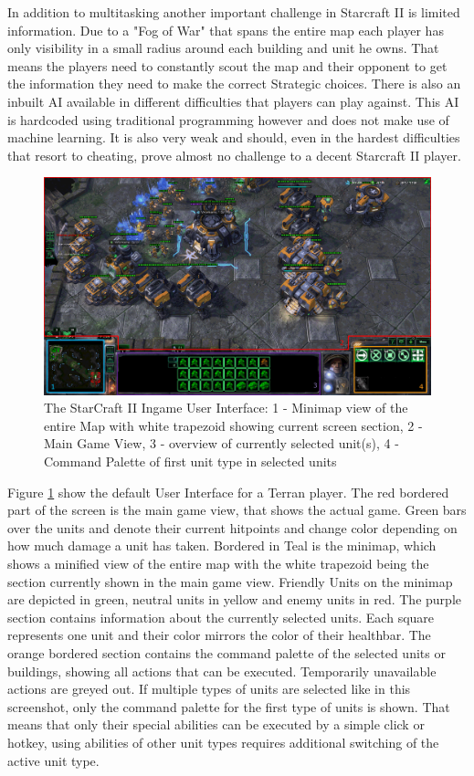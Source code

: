 In addition to multitasking another important challenge in Starcraft II is limited information. Due to a "Fog of War" that spans the entire map each player has only visibility in a small radius around each building and unit he owns. That means the players need to constantly scout the map and their opponent to get the information they need to make the correct Strategic choices.
There is also an inbuilt AI available in different difficulties that players can play against. This AI is hardcoded using traditional programming however and does not make use of machine learning. It is also very weak and should, even in the hardest difficulties that resort to cheating, prove almost no challenge to a decent Starcraft II player.

\begin{figure}[htb]
  \centering
      \includegraphics[width=1\textwidth]{Figures/gameview_bordered.png}
  \caption{The StarCraft II Ingame User Interface: 1 - Minimap view of the entire Map with white trapezoid showing current screen section, 2 - Main Game View, 3 - overview of currently selected unit(s), 4 - Command Palette of first unit type in selected units}
  \label{fig:gameview}
\end{figure}

Figure \ref{fig:gameview} show the default User Interface for a Terran player. The red bordered part of the screen is the main game view, that shows the actual game. Green bars over the units and denote their current hitpoints and change color depending on how much damage a unit has taken. Bordered in Teal is the minimap, which shows a minified view of the entire map with the white trapezoid being the section currently shown in the main game view. Friendly Units on the minimap are depicted in green, neutral units in yellow and enemy units in red. The purple section contains information about the currently selected units. Each square represents one unit and their color mirrors the color of their healthbar. The orange bordered section contains the command palette of the selected units or buildings, showing all actions that can be executed. Temporarily unavailable actions are greyed out. If multiple types of units are selected like in this screenshot, only the command palette for the first type of units is shown. That means that only their special abilities can be executed by a simple click or hotkey, using abilities of other unit types requires additional switching of the active unit type.


